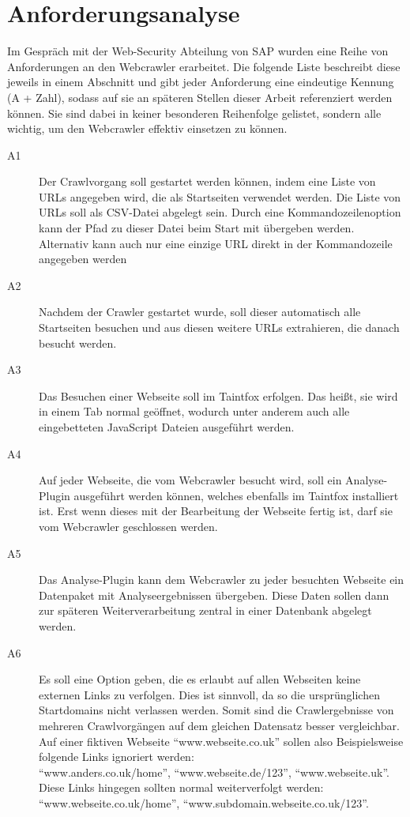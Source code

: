 \section{Anforderungsanalyse}
\label{sec:Anforderungsanalyse}
Im Gespräch mit der Web-Security Abteilung von SAP wurden eine Reihe von Anforderungen an den Webcrawler erarbeitet. Die folgende Liste beschreibt diese jeweils in einem Abschnitt und gibt jeder Anforderung eine eindeutige Kennung (A + Zahl), sodass auf sie an späteren Stellen dieser Arbeit referenziert werden können. Sie sind dabei in keiner besonderen Reihenfolge gelistet, sondern alle wichtig, um den Webcrawler effektiv einsetzen zu können.
\begin{description}
	\item[ A1 ] Der Crawlvorgang soll gestartet werden können, indem eine Liste von URLs angegeben wird, die als Startseiten verwendet werden. Die Liste von URLs soll als CSV-Datei abgelegt sein. Durch eine Kommandozeilenoption kann der Pfad zu dieser Datei beim Start mit übergeben werden. Alternativ kann auch nur eine einzige URL direkt in der Kommandozeile angegeben werden
	\item[ A2 ] Nachdem der Crawler gestartet wurde, soll dieser automatisch alle Startseiten besuchen und aus diesen weitere URLs extrahieren, die danach besucht werden.
	\item[ A3 ] Das Besuchen einer Webseite soll im Taintfox erfolgen. Das heißt, sie wird in einem Tab normal geöffnet, wodurch unter anderem auch alle eingebetteten JavaScript Dateien ausgeführt werden. 
	\item[ A4 ] Auf jeder Webseite, die vom Webcrawler besucht wird, soll ein Analyse-Plugin ausgeführt werden können, welches ebenfalls im Taintfox installiert ist. Erst wenn dieses mit der Bearbeitung der Webseite fertig ist, darf sie vom Webcrawler geschlossen werden.
	\item[ A5 ] Das Analyse-Plugin kann dem Webcrawler zu jeder besuchten Webseite ein Datenpaket mit Analyseergebnissen übergeben. Diese Daten sollen dann zur späteren Weiterverarbeitung zentral in einer Datenbank abgelegt werden.
	\item[ A6 ] Es soll eine Option geben, die es erlaubt auf allen Webseiten keine externen Links zu verfolgen. Dies ist sinnvoll, da so die ursprünglichen Startdomains nicht verlassen werden. Somit sind die Crawlergebnisse von mehreren Crawlvorgängen auf dem gleichen Datensatz besser vergleichbar. Auf einer fiktiven Webseite \enquote{www.webseite.co.uk} sollen also Beispielsweise folgende Links ignoriert werden: \\ \enquote{www.anders.co.uk/home}, \enquote{www.webseite.de/123}, \enquote{www.webseite.uk}. Diese Links hingegen sollten normal weiterverfolgt werden: \\  \enquote{www.webseite.co.uk/home},  \enquote{www.subdomain.webseite.co.uk/123}. \\

\end{description}
